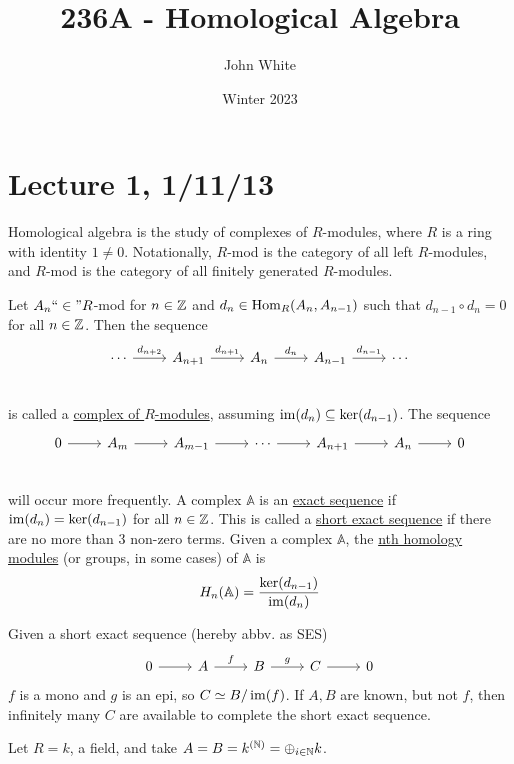 \documentclass[x11names,reqno,14pt]{extarticle}
\title{236A - Homological Algebra}
\author{John White}
\date{Winter 2023}
\newcommand{\A}{\mathbb{A}}
\newcommand{\fin}{``\in"}
\begin{document}
\section*{Lecture 1, 1/11/13}

Homological algebra is the study of complexes of $R$-modules, where $R$ is a ring with identity $1\neq0$. Notationally, $R$-mod is the category of all left $R$-modules, and $R$-mod is the category of all finitely generated $R$-modules. 


Let $A_n\fin R$-mod for $n\in\mathbb{Z}$ and $d_n\in{\mathrm{Hom}}_R(A_n, A_{n - 1})$ such that $d_{n - 1}\circ d_n = 0$ for all $n \in\mathbb{Z}$. Then the sequence
\[
\begin{tikzcd}
\cdots\ar[r, "d_{n + 2}"]& A_{n + 1}\ar[r, "d_{n + 1}"] & A_n \ar[r, "d_n"] & A_{n - 1} \ar[r, "d_{n - 1}"] & \cdots\\
\end{tikzcd}
\]
is called a \underline{complex of $R$-modules}, assuming $\operatorname{\mathrm{im}}(d_n) \subseteq \ker(d_{n - 1})$. The sequence
\[
\begin{tikzcd}
0\ar[r]&A_m\ar[r]&A_{m - 1}\ar[r]&\cdots\ar[r]&A_{n + 1}\ar[r]&A_n\ar[r]&0 \\
\end{tikzcd}
\]
will occur more frequently. A complex $\A$ is an \underline{exact sequence} if $\operatorname{\mathrm{im}}(d_n) = \ker(d_{n - 1})$ for all $n \in \mathbb{Z}$. This is called a \underline{short exact sequence} if there are no more than 3 non-zero terms. Given a complex $\A$, the \underline{nth homology modules} (or groups, in some cases) of $\A$ is
\[
H_n(\A) = \frac{\ker(d_{n -1})}{\im(d_n)}
\]

\rem

Given a short exact sequence (hereby abbv. as SES) 
\[
\begin{tikzcd}
0\ar[r]&A\ar[r,"f"]&B\ar[r,"g"]&C\ar[r]&0
\end{tikzcd}
\]
$f$ is a mono and $g$ is an epi, so $C\simeq B/\operatorname{\mathrm{im}}(f)$. If $A, B$ are known, but not $f$, then infinitely many $C$ are available to complete the short exact sequence.

\exm 

Let $R = k$, a field, and take $A = B = k^{(\mathbb{N})} = \oplus_{i\in\mathbb{N}}k$.
\end{document}
